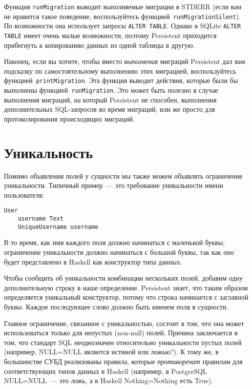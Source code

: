 Функция \lstinline'runMigration' выводит выполняемые миграции в STDERR (если
вам не нравится такое поведение, воспользуйтесь
функцией~\lstinline'runMigrationSilent'). По возможности она использует запросы
\texttt{ALTER TABLE}. Однако в SQLite \texttt{ALTER TABLE} имеет очень малые
возможности, поэтому Persistent приходится прибегнуть к копированию данных из
одной таблицы в другую.

Наконец, если вы хотите, чтобы вместо \emph{выполнения} миграций Persistent дал
вам подсказку по самостоятельному выполнению этих миграцией, воспользуйтесь
функцией~\lstinline'printMigration'. Эта функция выводит действия, которые были
бы выполнены функцией~\lstinline'runMigration'. Это может быть полезно в случае
выполнения миграций, на который Persistent не способен, выполнения
дополнительных SQL-запросов во время миграций, или же просто для
протоколирования происходящих миграций.

\section{Уникальность}

Помимо объявления полей у сущности мы также можем объявлять ограничение
уникальности. Типичный пример~--- это требование уникальности имени
пользователя:

\begin{lstlisting}
User
    username Text
    UniqueUsername username
\end{lstlisting}

В то время, как имя каждого поля должно начинаться с маленькой буквы,
ограничение уникальности должно начинаться с большой буквы, так как оно будет
представлено в Haskell как конструктор типа данных.


Чтобы сообщить об уникальности комбинации нескольких полей, добавим одну
дополнительную строку в наше определение. Persistent знает, что таким образом
определяется уникальный конструктор, потому что строка начинается с заглавной
буквы. Каждое последующее слово должно быть именем поля в сущности.

Главное ограничение, связанное с уникальностью, состоит в том, что она может
использоваться только для непустых (non-null) полей. Причина заключается в том,
что стандарт SQL неоднозначен относительно уникальности пустых полей (например,
NULL=NULL является истиной или ложью?). К тому же, в большинстве СУБД
реализованы правила, которые \emph{противоречат} правилам для соответствующих
типов данных в Haskell (например, в PostgreSQL NULL=NULL~--- это ложь, а в
Haskell Nothing=Nothing есть True).

